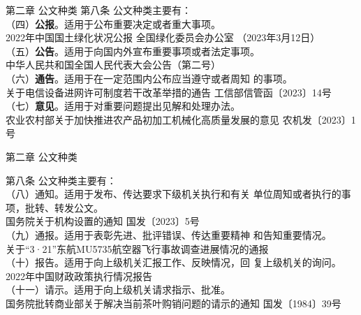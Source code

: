 \documentclass[aspectratio=169]{beamer}
\begin{document}
    \begin{frame}[t]{第二章 公文种类} \vspace{20pt}
        第八条 公文种类主要有：\\
        （四）\textbf{公报}。适用于公布重要决定或者重大事项。\\
        {\scriptsize
        2022年中国国土绿化状况公报
        全国绿化委员会办公室
        （2023年3月12日）
        }\\


        （五）\textbf{公告}。适用于向国内外宣布重要事项或者法定事项。\\
        {\scriptsize
        中华人民共和国全国人民代表大会公告（第二号）
        }\\

        （六）\textbf{通告}。适用于在一定范围内公布应当遵守或者周知
        的事项。\\
        {\scriptsize
        关于电信设备进网许可制度若干改革举措的通告
        工信部信管函〔2023〕14号
        }\\

        （七）\textbf{意见}。适用于对重要问题提出见解和处理办法。\\
        {\scriptsize
        农业农村部关于加快推进农产品初加工机械化高质量发展的意见
        农机发〔2023〕1号
        }\\
    \end{frame}




    \begin{frame}[t]{第二章 公文种类} \vspace{20pt}

        第八条 公文种类主要有：\\
        （八）通知。适用于发布、传达要求下级机关执行和有关
        单位周知或者执行的事项，批转、转发公文。\\
        {\scriptsize
        国务院关于机构设置的通知
        国发〔2023〕5号
        }\\

        （九）通报。适用于表彰先进、批评错误、传达重要精神
        和告知重要情况。\\
        {\scriptsize
        关于“3·21”东航MU5735航空器飞行事故调查进展情况的通报
        }\\



        （十）报告。适用于向上级机关汇报工作、反映情况，回
        复上级机关的询问。\\
        {\scriptsize
        2022年中国财政政策执行情况报告
        }\\

        （十一）请示。适用于向上级机关请求指示、批准。\\
        {\scriptsize
        国务院批转商业部关于解决当前茶叶购销问题的请示的通知
        国发〔1984〕39号
        }\\
    \end{frame}
\end{document}
